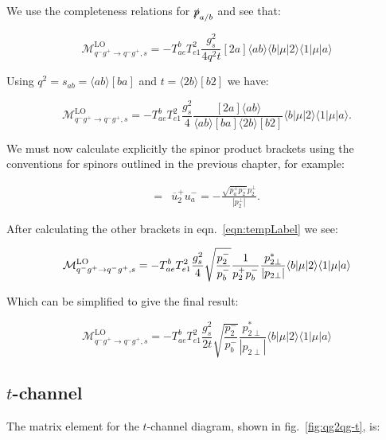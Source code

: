 		We use the completeness relations for $\slashed p_{a/b}$ and see that:

		\begin{equation}
			\mathcal{M}_{q^-g^+\to q^-g^+, s}^{\text{LO}}=-T^b_{ae}T^2_{e1}\frac{g^2_s}{4q^2t}[2a]\langle ab\rangle\langle{b}|\mu|2\rangle\langle{1}|\mu|a\rangle
		\end{equation}

		Using $q^2=s_{ab}=\langle ab\rangle[ba]$ and $t=\langle2b\rangle[b2]$ we have:

		\begin{equation}
		\mathcal{M}_{q^-g^+\to q^-g^+, s}^{\text{LO}}=-T^b_{ae}T^2_{e1}\frac{g^2_s}{4}\frac{[2a]\langle ab\rangle}{\langle ab\rangle[ba]
		\langle2b\rangle[b2]}\langle{b}|\mu|2\rangle\langle{1}|\mu|a\rangle.
		\label{eqn:tempLabel}
		\end{equation}

		We must now calculate explicitly the spinor product brackets using the conventions for spinors outlined in the
		previous chapter, for example:

		\begin{align}
			[2a] = &\overline{u}^+_2u^-_a=-\frac{\sqrt{p_a^+p_2^-}p_2^\perp}{|p_2^\perp|}.
		\end{align}

		After calculating the other brackets in eqn.~\eqref{eqn:tempLabel} we see:

		\begin{equation}
			\mathcal{M}_{q^-g^+\to q^-g^+, s}^{\text{LO}} = -T^b_{ae}T^2_{e1}\frac{g_s^2}{4}\sqrt{\frac{p_2^-}{p_b^-}}\frac{1}{p_2^+p_b^-} \frac{p_{2\perp}^*}{|p_{2\perp}|} \langle b | \mu | 2 \rangle \langle 1 | \mu | a \rangle
		\end{equation}

		Which can be simplified to give the final result:

		\begin{equation}
			\mathcal{M}_{q^-g^+\to q^-g^+, s}^{\text{LO}}=-T^b_{ae}T^2_{e1}\frac{g_s^2}{2t}\sqrt{\frac{p_2^-}{p_b^-}}\frac{p_{2\perp}^*}
			{|p_{2\perp}|}\langle{b}|\mu|2\rangle\langle{1}|\mu|a\rangle
			\label{eqn:s-channel}
		\end{equation}

		\newpage

	\subsection{$t$-channel}

		The matrix element for the $t$-channel diagram, shown in fig.~\eqref{fig:qg2qg-t}, is:

